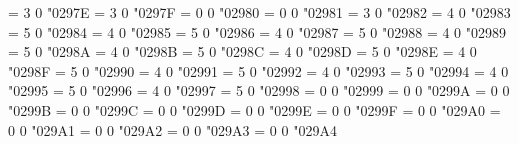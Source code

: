 \Umathchardef\upfishtail = 3 0 "0297E %
\Umathchardef\downfishtail = 3 0 "0297F %
\Umathchardef\Vvert = 0 0 "02980 %
\Umathchardef\mdsmblkcircle = 0 0 "02981 %
\Umathchardef\typecolon = 3 0 "02982 %
\Umathchardef\lBrace = 4 0 "02983 %
\Umathchardef\rBrace = 5 0 "02984 %
\Umathchardef\lParen = 4 0 "02985 %
\Umathchardef\rParen = 5 0 "02986 %
\Umathchardef\llparenthesis = 4 0 "02987 %
\Umathchardef\rrparenthesis = 5 0 "02988 %
\Umathchardef\llangle = 4 0 "02989 %
\Umathchardef\rrangle = 5 0 "0298A %
\Umathchardef\lbrackubar = 4 0 "0298B %
\Umathchardef\rbrackubar = 5 0 "0298C %
\Umathchardef\lbrackultick = 4 0 "0298D %
\Umathchardef\rbracklrtick = 5 0 "0298E %
\Umathchardef\lbracklltick = 4 0 "0298F %
\Umathchardef\rbrackurtick = 5 0 "02990 %
\Umathchardef\langledot = 4 0 "02991 %
\Umathchardef\rangledot = 5 0 "02992 %
\Umathchardef\lparenless = 4 0 "02993 %
\Umathchardef\rparengtr = 5 0 "02994 %
\Umathchardef\Lparengtr = 4 0 "02995 %
\Umathchardef\Rparenless = 5 0 "02996 %
\Umathchardef\lblkbrbrak = 4 0 "02997 %
\Umathchardef\rblkbrbrak = 5 0 "02998 %
\Umathchardef\fourvdots = 0 0 "02999 %
\Umathchardef\vzigzag = 0 0 "0299A %
\Umathchardef\measuredangleleft = 0 0 "0299B %
\Umathchardef\rightanglesqr = 0 0 "0299C %
\Umathchardef\rightanglemdot = 0 0 "0299D %
\Umathchardef\angles = 0 0 "0299E %
\Umathchardef\angdnr = 0 0 "0299F %
\Umathchardef\gtlpar = 0 0 "029A0 %
\Umathchardef\sphericalangleup = 0 0 "029A1 %
\Umathchardef\turnangle = 0 0 "029A2 %
\Umathchardef\revangle = 0 0 "029A3 %
\Umathchardef\angleubar = 0 0 "029A4 %
